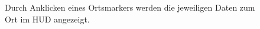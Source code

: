 \begin{figure}[p]
    \centering
    \caption{Durch Anklicken eines Ortsmarkers werden die jeweiligen Daten zum Ort im HUD angezeigt.}
    \label{fig:tctd_attributes}
\end{figure}
